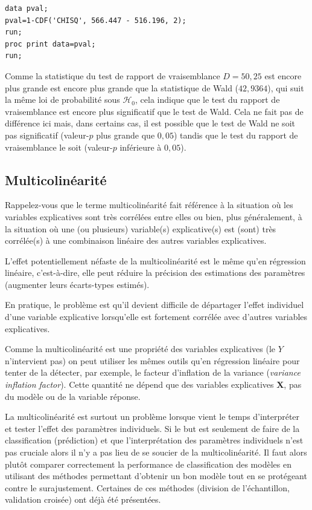 \documentclass[
  11pt,
  letterpaper,
]{book}
\theoremstyle{definition}
\theoremstyle{definition}
\theoremstyle{definition}
\theoremstyle{remark}
\begin{document}
\begin{verbatim}
data pval;
pval=1-CDF('CHISQ', 566.447 - 516.196, 2);
run;
proc print data=pval;
run;
\end{verbatim}

Comme la statistique du test de rapport de vraisemblance \(D=50,25\) est encore plus grande est encore plus grande que la statistique de Wald (\(42,9364\)), qui suit la même loi de probabilité sous \(\mathcal{H}_0\), cela indique que le test du rapport de vraisemblance est encore plus significatif que le test de Wald. Cela ne fait pas de différence ici mais, dans certains cas, il est possible que le test de Wald ne soit pas significatif (valeur-\(p\) plus grande que \(0,05\)) tandis que le test du rapport de vraisemblance le soit (valeur-\(p\) inférieure à \(0,05\)).

\hypertarget{multicolinuxe9arituxe9}{%
\subsection{Multicolinéarité}\label{multicolinuxe9arituxe9}}

Rappelez-vous que le terme multicolinéarité fait référence à la situation où les variables explicatives sont très corrélées entre elles ou bien, plus généralement, à la situation où une (ou plusieurs) variable(s) explicative(s) est (sont) très corrélée(s) à une combinaison linéaire des autres variables explicatives.

L'effet potentiellement néfaste de la multicolinéarité est le même qu'en régression linéaire, c'est-à-dire, elle peut réduire la précision des estimations des paramètres (augmenter leurs écarts-types estimés).

En pratique, le problème est qu'il devient difficile de départager l'effet individuel d'une variable explicative lorsqu'elle est fortement corrélée avec d'autres variables explicatives.

Comme la multicolinéarité est une propriété des variables explicatives (le \(Y\) n'intervient pas) on peut utiliser les mêmes outils qu'en régression linéaire pour tenter de la détecter, par exemple, le facteur d'inflation de la variance (\emph{variance inflation factor}). Cette quantité ne dépend que des variables explicatives \(\boldsymbol{X}\), pas du modèle ou de la variable réponse.

La multicolinéarité est surtout un problème lorsque vient le temps d'interpréter et tester l'effet des paramètres individuels. Si le but est seulement de faire de la classification (prédiction) et que l'interprétation des paramètres individuels n'est pas cruciale alors il n'y a pas lieu de se soucier de la multicolinéarité. Il faut alors plutôt comparer correctement la performance de classification des modèles en utilisant des méthodes permettant d'obtenir un bon modèle tout en se protégeant contre le surajustement. Certaines de ces méthodes (division de l'échantillon, validation croisée) ont déjà été présentées.
\end{document}
